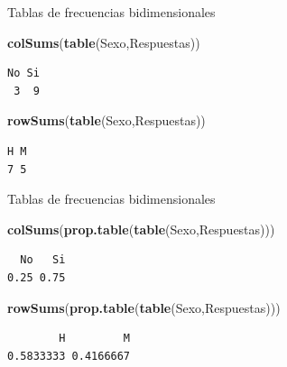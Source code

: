 \documentclass[
  ignorenonframetext,
]{beamer}
\newenvironment{Shaded}{\begin{snugshade}}{\end{snugshade}}
\newcommand{\FunctionTok}[1]{\textcolor[rgb]{0.13,0.29,0.53}{\textbf{#1}}}
\newcommand{\NormalTok}[1]{#1}
\begin{document}
\begin{frame}[fragile]{Tablas de frecuencias bidimensionales}
\label{tablas-de-frecuencias-bidimensionales-9}
\begin{Shaded}
\begin{Highlighting}[]
\FunctionTok{colSums}\NormalTok{(}\FunctionTok{table}\NormalTok{(Sexo,Respuestas)) }
\end{Highlighting}
\end{Shaded}

\begin{verbatim}
No Si 
 3  9 
\end{verbatim}

\begin{Shaded}
\begin{Highlighting}[]
\FunctionTok{rowSums}\NormalTok{(}\FunctionTok{table}\NormalTok{(Sexo,Respuestas)) }
\end{Highlighting}
\end{Shaded}

\begin{verbatim}
H M 
7 5 
\end{verbatim}
\end{frame}

\begin{frame}[fragile]{Tablas de frecuencias bidimensionales}
\label{tablas-de-frecuencias-bidimensionales-10}
\begin{Shaded}
\begin{Highlighting}[]
\FunctionTok{colSums}\NormalTok{(}\FunctionTok{prop.table}\NormalTok{(}\FunctionTok{table}\NormalTok{(Sexo,Respuestas)))}
\end{Highlighting}
\end{Shaded}

\begin{verbatim}
  No   Si 
0.25 0.75 
\end{verbatim}

\begin{Shaded}
\begin{Highlighting}[]
\FunctionTok{rowSums}\NormalTok{(}\FunctionTok{prop.table}\NormalTok{(}\FunctionTok{table}\NormalTok{(Sexo,Respuestas)))}
\end{Highlighting}
\end{Shaded}

\begin{verbatim}
        H         M 
0.5833333 0.4166667 
\end{verbatim}
\end{frame}
\end{document}

